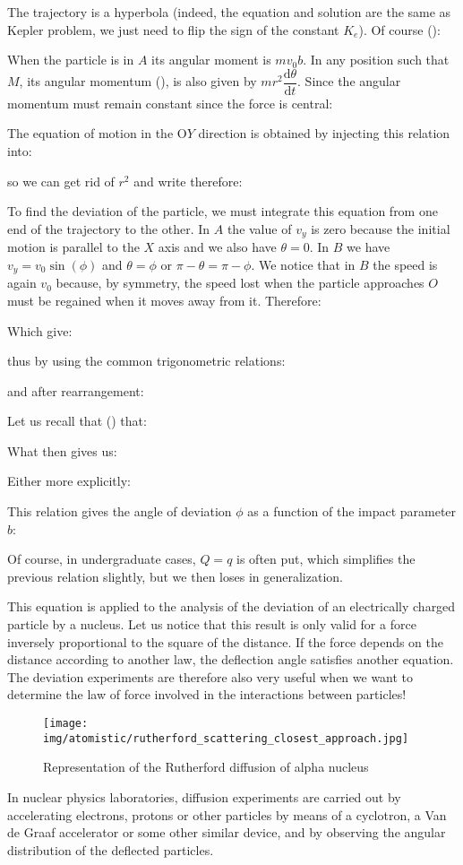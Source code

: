	The trajectory is a hyperbola (indeed, the equation and solution are the same as Kepler problem, we just need to flip the sign of the constant $K_e$). Of course ():
	
	When the particle is in $A$ its angular moment is $mv_0b$. In any position such that $M$, its angular momentum (), is also given by $mr^2\dfrac{\mathrm{d}\theta}{\mathrm{d}t}$. Since the angular momentum must remain constant since the force is central:
	
	The equation of motion in the O$Y$ direction is obtained by injecting this relation into:
	
	so we can get rid of $r^2$ and write therefore:
	
	To find the deviation of the particle, we must integrate this equation from one end of the trajectory to the other. In $A$ the value of $v_y$ is zero because the initial motion is parallel to the $X$ axis and we also have $\theta=0$. In $B$ we have $v_y=v_0\sin(\phi)$ and $\theta=\phi$ or $\pi-\theta=\pi-\phi$. We notice that in $B$ the speed is again $v_0$ because, by symmetry, the speed lost when the particle approaches $O$ must be regained when it moves away from it. Therefore:
	
	Which give:
	
	thus by using the common trigonometric relations:
	
	and after rearrangement:
	
	Let us recall that () that:
	
	What then gives us:
	
	Either more explicitly:
	
	This relation gives the angle of deviation $\phi$ as a function of the impact parameter $b$:
	
	Of course, in undergraduate cases, $Q = q$ is often put, which simplifies the previous relation slightly, but we then loses in generalization.
	
	This equation is applied to the analysis of the deviation of an electrically charged particle by a nucleus. Let us notice that this result is only valid for a force inversely proportional to the square of the distance. If the force depends on the distance according to another law, the deflection angle satisfies another equation. The deviation experiments are therefore also very useful when we want to determine the law of force involved in the interactions between particles!
	\begin{figure}[H]
		\centering
		\texttt{[image: img/atomistic/rutherford\_scattering\_closest\_approach.jpg]}
		\caption{Representation of the Rutherford diffusion of alpha nucleus}
	\end{figure}
	In nuclear physics laboratories, diffusion experiments are carried out by accelerating electrons, protons or other particles by means of a cyclotron, a Van de Graaf accelerator or some other similar device, and by observing the angular distribution of the deflected particles.

